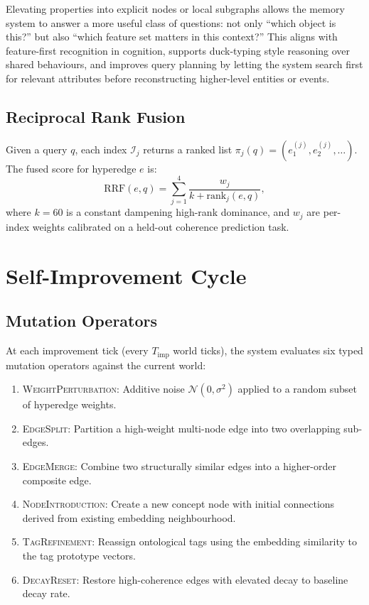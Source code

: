 \documentclass[11pt]{article}
\begin{document}
Elevating properties into explicit nodes or local subgraphs allows the memory
system to answer a more useful class of questions: not only ``which object is
this?'' but also ``which feature set matters in this context?'' This aligns with
feature-first recognition in cognition, supports duck-typing style reasoning over
shared behaviours, and improves query planning by letting the system search first
for relevant attributes before reconstructing higher-level entities or events.

\subsection{Reciprocal Rank Fusion}

Given a query $q$, each index $\mathcal{I}_j$ returns a ranked list
$\pi_j(q) = (e_1^{(j)}, e_2^{(j)}, \ldots)$. The fused score for hyperedge $e$
is:
\begin{equation}
  \text{RRF}(e, q) = \sum_{j=1}^{4} \frac{w_j}{k + \text{rank}_j(e, q)},
  \label{eq:rrf}
\end{equation}
where $k = 60$ is a constant dampening high-rank dominance, and $w_j$ are
per-index weights calibrated on a held-out coherence prediction task.

\section{Self-Improvement Cycle}
\nopagebreak[4]
\label{sec:self_improve}

\subsection{Mutation Operators}

At each improvement tick (every $T_{\text{imp}}$ world ticks), the system
evaluates six typed mutation operators against the current world:

\begin{enumerate}[noitemsep,topsep=4pt]
  \item \textsc{WeightPerturbation}: Additive noise $\mathcal{N}(0, \sigma^2)$
        applied to a random subset of hyperedge weights.
  \item \textsc{EdgeSplit}: Partition a high-weight multi-node edge into two
        overlapping sub-edges.
  \item \textsc{EdgeMerge}: Combine two structurally similar edges into a
        higher-order composite edge.
  \item \textsc{NodeIntroduction}: Create a new concept node with initial
        connections derived from existing embedding neighbourhood.
  \item \textsc{TagRefinement}: Reassign ontological tags using the embedding
        similarity to the tag prototype vectors.
  \item \textsc{DecayReset}: Restore high-coherence edges with elevated decay
        to baseline decay rate.
\end{enumerate}
\end{document}
